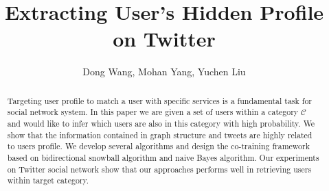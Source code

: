 \documentclass{sig-alternate}
\title{Extracting User's Hidden Profile on Twitter}
\author{Dong Wang, Mohan Yang, Yuchen Liu}
\begin{document}
\maketitle

\begin{abstract}
Targeting user profile to match a user with specific services is a fundamental task for social network system. In this paper we are given a set of users within a category $\mathcal{C}$ and would like to infer which users are also in this category with high probability. We show that the information contained in graph structure and tweets are highly related to users profile. We develop several algorithms and design the co-training framework based on bidirectional snowball algorithm and naive Bayes algorithm. Our experiments on Twitter social network show that our approaches performs well in retrieving users within target category.
\end{abstract}









{ }
\end{document}

